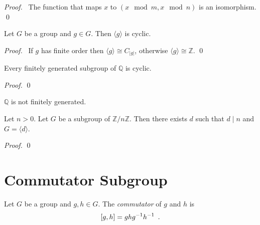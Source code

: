 \begin{proof}
    \pf\ The function that maps $x$ to $(x \mod m, x \mod n)$ is an isomorphism. \qed
\end{proof}

\begin{prop}
Let $G$ be a group and $g \in G$. Then $\langle g \rangle$ is cyclic.
\end{prop}

\begin{proof}
\pf\ If $g$ has finite order then $\langle g \rangle \cong C_{|g|}$, otherwise $\langle g \rangle \cong \mathbb{Z}$. \qed
\end{proof}

\begin{prop}
Every finitely generated subgroup of $\mathbb{Q}$ is cyclic.
\end{prop}

\begin{proof}
\pf
{}
\qed
\end{proof}

\begin{cor}
$\mathbb{Q}$ is not finitely generated.
\end{cor}

\begin{prop}
\label{prop:subgroup-of-Z-nZ}
Let $n > 0$. Let $G$ be a subgroup of $\mathbb{Z} / n \mathbb{Z}$. Then there exists $d$ such that $d \mid n$ and $G = \langle d \rangle$.
\end{prop}

\begin{proof}
\pf
{}
\qed
\end{proof}

\section{Commutator Subgroup}

\begin{df}[Commutator]
Let $G$ be a group and $g,h \in G$. The \emph{commutator} of $g$ and $h$ is
\[ [g,h] = gh{g}^{-1} {h}^{-1} \enspace . \]
\end{df}

